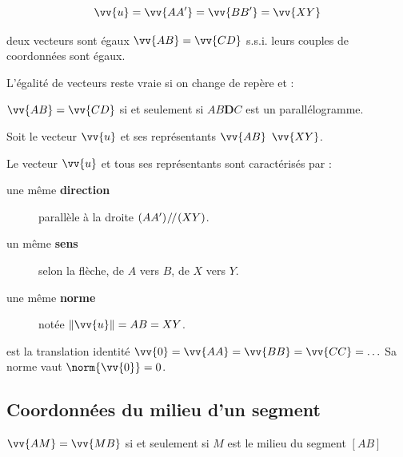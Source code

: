 \setlength{\belowdisplayskip}{0pt}
\[
\vv{u}=\vv{AA'}=\vv{BB'}=\vv{XY}
\]   
\begin{definition} deux vecteurs sont égaux $\vv{AB}=\vv{CD}$ s.s.i. leurs couples de coordonnées sont égaux. 
\end{definition}  
\begin{postulat}  L'égalité de vecteurs reste vraie si on change de repère et :
	
	$\vv{AB}=\vv{CD}$  si et seulement si $AB\textbf{D}C$ est un parallélogramme. 
\end{postulat}  
\vfill 



\begin{definition} Soit le vecteur $\vv{u}$ et ses représentants $\vv{AB}$  $\vv{XY}$. 
	
	Le vecteur $\vv{u}$ et tous ses représentants sont caractérisés par :
	\begin{description}
		\item[une même \textbf{direction}] parallèle à la droite $\left( {AA'} \right)\mathbin{\!/\mkern-2mu/\!}  \left( {XY} \right)$.
		\item[un même \textbf{sens}] selon la flèche, de $A$ vers $B$, de $X$ vers $Y$.
		\item[une même \textbf{norme}] notée $\left\| \vv{u} \right\|= AB=XY$.
	\end{description}  
\end{definition} 


\begin{definition} est la translation identité  
	$ \vv{0}=\vv{AA}=\vv{BB}=\vv{CC}=\ldots$ Sa norme vaut $\norm{\vv{0}}=0$.
\end{definition}   

%	 
\newpage  
\subsection{Coordonnées du milieu d'un segment}
\begin{tBox}
	$\vv{AM}=\vv{MB}$ si et seulement si $M$ est le milieu du segment $[AB]$ 
\end{tBox} 

